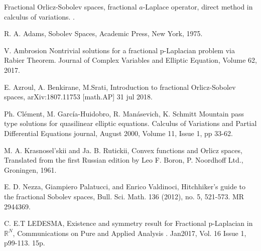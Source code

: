 \documentclass [12pt]{article}
\numberwithin{equation}{section}
\begin{document}
\vspace*{0.5cm}

 Fractional Orlicz-Sobolev spaces, fractional $a$-Laplace operator, direct method in calculus of variations.
 .\\




\begin{thebibliography}{99}

   R. A. Adams, Sobolev Spaces, Academic Press, New York, 1975.
    
     
     V. Ambrosion   Nontrivial solutions for a fractional p-Laplacian problem via Rabier Theorem. Journal of
       Complex Variables and Elliptic Equation, Volume 62, 2017.
       
	  E. Azroul, A. Benkirane, M.Srati, Introduction to fractional Orlicz-Sobolev spaces, arXiv:1807.11753 [math.AP] 31 jul 2018.
 	 
   Ph. Cl\'ement, M. Garc\'ia-Huidobro, R. Man\'asevich, K. Schmitt Mountain pass type solutions for quasilinear elliptic equations. Calculus of Variations and Partial Differential Equations journal,
 	       August 2000, Volume 11, Issue 1, pp 33-62.
 	     
 	              M. A. Krasnosel'skii and Ja. B. Rutickii, Convex functions and Orlicz spaces, Translated from
 	                          the first Russian edition by Leo F. Boron, P. Noordhoff Ltd., Groningen, 1961.
 	     
 
         E. D. Nezza, Giampiero Palatucci, and Enrico Valdinoci, Hitchhiker's guide to the
              fractional Sobolev spaces, Bull. Sci. Math. 136 (2012), no. 5, 521-573. MR 2944369.
        
        C. E.T LEDESMA, Existence and symmetry result for Fractional
              	  p-Laplacian in  $\mathbb{R}^N$, Communications on Pure and Applied Analysis . Jan2017, Vol. 16 Issue 1, p99-113. 15p. 
              
\end{thebibliography}
\end{document}
